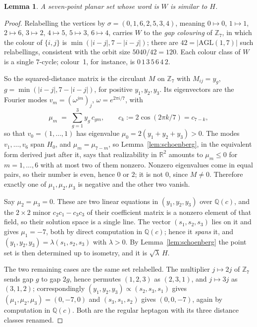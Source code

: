 \documentclass[11pt]{amsart}
\numberwithin{theorem}{section}
\newtheorem{lemma}[theorem]{Lemma}
\theoremstyle{remark}
\theoremstyle{definition}
\newcommand{\Zs}{\mathbb Z}
\begin{document}
\begin{lemma}\label{lem:heptagononly}
A seven-point planar set whose word is $W$ is similar to $H$.
\end{lemma}

\begin{proof}
Relabelling the vertices by $\sigma=(0,1,6,2,5,3,4)$, meaning $0\mapsto0$,
$1\mapsto1$, $2\mapsto6$, $3\mapsto2$, $4\mapsto5$, $5\mapsto3$,
$6\mapsto4$, carries $W$ to the \emph{gap colouring} of $\Zs_7$, in which the
colour of $\{i,j\}$ is $\min(|i-j|,7-|i-j|)$; there are $42=|\mathrm{AGL}(1,7)|$
such relabellings, consistent with the orbit size $5040/42=120$. Each colour
class of $W$ is a single $7$-cycle; colour~1, for instance, is
$0\,1\,3\,5\,6\,4\,2$.

So the squared-distance matrix is the circulant $M$ on $\Zs_7$ with
$M_{ij}=y_{g}$, $g=\min(|i-j|,7-|i-j|)$, for positive $y_1,y_2,y_3$. Its
eigenvectors are the Fourier modes $v_m=(\omega^{jm})_j$, $\omega=e^{2\pi i/7}$,
with
\[
  \mu_m \;=\; \sum_{g=1}^{3} y_g\,c_{gm},
  \qquad c_k := 2\cos(2\pi k/7)=c_{7-k},
\]
so that $v_0=(1,\dots,1)$ has eigenvalue $\mu_0=2(y_1+y_2+y_3)>0$. The modes
$v_1,\dots,v_6$ span $H_0$, and $\mu_m=\mu_{7-m}$, so
Lemma~\ref{lem:schoenberg}, in the equivalent form derived just after it, says
that realizability in $\mathbb R^2$ amounts to $\mu_m\le0$
for $m=1,\dots,6$ with at most two of them nonzero. Nonzero eigenvalues come
in equal pairs, so their number is even, hence $0$ or $2$; it is not $0$, since
$M\ne0$. Therefore exactly one of $\mu_1,\mu_2,\mu_3$ is negative and the other
two vanish.

Say $\mu_2=\mu_3=0$. These are two linear equations in $(y_1,y_2,y_3)$ over
$\mathbb Q(c)$, and the $2\times2$ minor $c_2c_1-c_3c_3$ of their coefficient
matrix is a nonzero element of that field, so their solution space is a single
line. The vector $(s_1,s_2,s_3)$ lies on it and gives $\mu_1=-7$, both by direct
computation in $\mathbb Q(c)$; hence it \emph{spans} it, and
$(y_1,y_2,y_3)=\lambda(s_1,s_2,s_3)$ with $\lambda>0$. By
Lemma~\ref{lem:schoenberg} the point set is then determined up to isometry, and
it is $\sqrt\lambda\,H$.

The two remaining cases are the same set relabelled. The multiplier
$j\mapsto2j$ of $\Zs_7$ sends gap $g$ to gap $2g$, hence permutes $(1,2,3)$ as
$(2,3,1)$, and $j\mapsto3j$ as $(3,1,2)$; correspondingly
$(y_1,y_2,y_3)\propto(s_2,s_3,s_1)$ gives $(\mu_1,\mu_2,\mu_3)=(0,-7,0)$ and
$(s_3,s_1,s_2)$ gives $(0,0,-7)$, again by computation in $\mathbb Q(c)$. Both
are the regular heptagon with its three distance classes renamed.
\end{proof}
\end{document}
